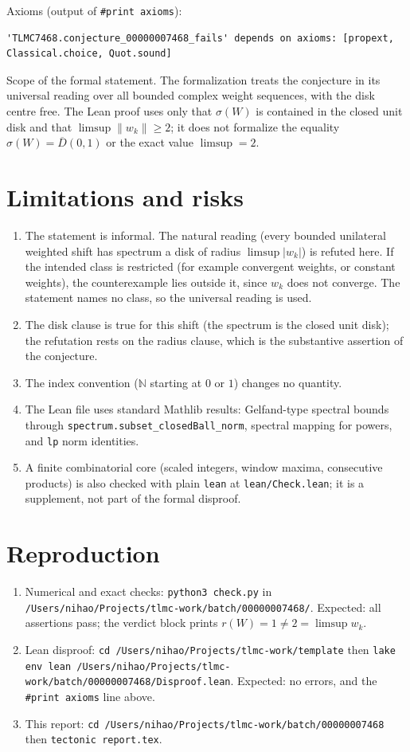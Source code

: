 \documentclass[11pt]{article}
\theoremstyle{definition}
\begin{document}
Axioms (output of \texttt{\#print axioms}):
\begin{lstlisting}
'TLMC7468.conjecture_00000007468_fails' depends on axioms: [propext, Classical.choice, Quot.sound]
\end{lstlisting}

Scope of the formal statement. The formalization treats the conjecture in its universal reading over all
bounded complex weight sequences, with the disk centre free. The Lean proof uses only that
$\sigma(W)$ is contained in the closed unit disk and that $\limsup\|w_k\|\ge 2$; it does not formalize
the equality $\sigma(W)=\overline{D}(0,1)$ or the exact value $\limsup=2$.

\section{Limitations and risks}

\begin{enumerate}
\item The statement is informal. The natural reading (every bounded unilateral weighted shift has spectrum a
disk of radius $\limsup|w_k|$) is refuted here. If the intended class is restricted (for example convergent
weights, or constant weights), the counterexample lies outside it, since $w_k$ does not converge.
The statement names no class, so the universal reading is used.
\item The disk clause is true for this shift (the spectrum is the closed unit disk); the refutation rests on the
radius clause, which is the substantive assertion of the conjecture.
\item The index convention ($\mathbb{N}$ starting at $0$ or $1$) changes no quantity.
\item The Lean file uses standard Mathlib results: Gelfand-type spectral bounds through
\texttt{spectrum.subset\_closedBall\_norm}, spectral mapping for powers, and \texttt{lp} norm identities.
\item A finite combinatorial core (scaled integers, window maxima, consecutive products) is also checked with plain
\texttt{lean} at \texttt{lean/Check.lean}; it is a supplement, not part of the formal disproof.
\end{enumerate}

\section{Reproduction}

\begin{enumerate}
\item Numerical and exact checks: \texttt{python3 check.py} in
\texttt{/Users/nihao/Projects/tlmc-work/batch/00000007468/}. Expected: all assertions pass; the verdict block
prints $r(W)=1\neq 2=\limsup w_k$.
\item Lean disproof: \texttt{cd /Users/nihao/Projects/tlmc-work/template} then
\texttt{lake env lean /Users/nihao/Projects/tlmc-work/batch/00000007468/Disproof.lean}. Expected: no errors, and the
\texttt{\#print axioms} line above.
\item This report: \texttt{cd /Users/nihao/Projects/tlmc-work/batch/00000007468} then \texttt{tectonic report.tex}.
\end{enumerate}
\end{document}
